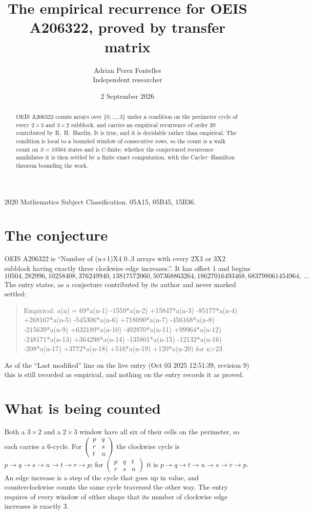 \documentclass[11pt,a4paper]{article}
\title{The empirical recurrence for OEIS A206322, proved by transfer matrix}
\author{Adrian Perez Fontelles\\ \small Independent researcher}
\date{2 September 2026}
\theoremstyle{plain}
\theoremstyle{definition}
\begin{document}
\maketitle

\begin{abstract}
OEIS A206322 counts arrays over $\{0,\dots,3\}$ under a condition on the perimeter cycle of
every $2\times3$ and $3\times2$ subblock, and carries an empirical recurrence of order $20$ contributed by
R.~H.~Hardin. It is true, and it is decidable rather than empirical. The condition is local to
a bounded window of consecutive rows, so the count is a walk count on $S=10504$ states and is
$C$-finite; whether the conjectured recurrence annihilates it is then settled by a finite exact
computation, with the Cayley--Hamilton theorem bounding the work.
\end{abstract}

\noindent\small 2020 Mathematics Subject Classification. 05A15, 05B45, 15B36.\normalsize

\section{The conjecture}

OEIS A206322 is ``Number of (n+1)X4 0..3 arrays with every 2X3 or 3X2 subblock having exactly three clockwise edge increases.''. It has offset $1$ and begins
\[
10504, 282996, 10258408, 376249940, 13817572060, 507368863264, 18627016493468, 683798061454964,\ \dots
\]
The entry states, as a conjecture contributed by its author and never marked settled:
\begin{quote}
Empirical: a(n) = 69*a(n-1) -1559*a(n-2) +15847*a(n-3) -85177*a(n-4) +268167*a(n-5) -545306*a(n-6) +718090*a(n-7) -456168*a(n-8) -215639*a(n-9) +632189*a(n-10) -402870*a(n-11) +99964*a(n-12) -248171*a(n-13) +364298*a(n-14) -135801*a(n-15) -12132*a(n-16) -208*a(n-17) +3772*a(n-18) +516*a(n-19) +120*a(n-20) for n>23
\end{quote}
As of the ``Last modified'' line on the live entry (Oct 03 2025 12:51:39, revision 9) this is still
recorded as empirical, and nothing on the entry records it as proved.

\section{What is being counted}

Both a $3\times2$ and a $2\times3$ window have all six of their cells on the
perimeter, so each carries a $6$-cycle. For
$\begin{pmatrix}p&q\\r&s\\t&u\end{pmatrix}$ the clockwise cycle is
$p\to q\to s\to u\to t\to r\to p$; for
$\begin{pmatrix}p&q&t\\r&s&u\end{pmatrix}$ it is
$p\to q\to t\to u\to s\to r\to p$. An edge increase is a step of the cycle that goes up in
value, and counterclockwise counts the same cycle traversed the other way. The entry requires
of every window of either shape that its number of clockwise edge increases is exactly $3$.
\end{document}
